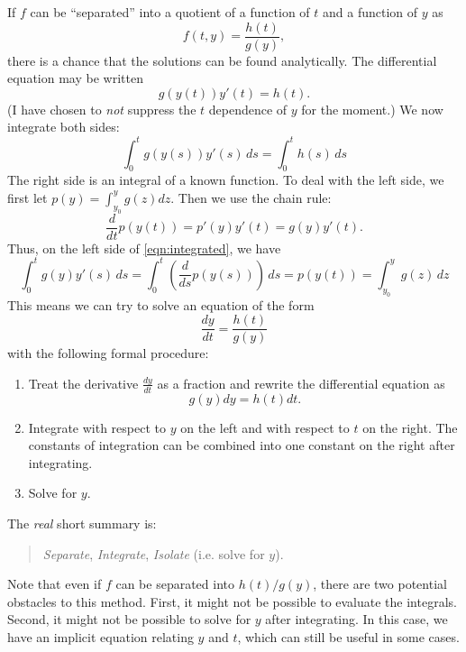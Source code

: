 \medskip
If $f$ can be ``separated'' into a quotient of a function of $t$ and a function
of $y$ as
\begin{equation}
   f(t,y) = \frac{h(t)}{g(y)},
\end{equation}
there is a chance that the solutions can
be found analytically.
The differential equation may be written
\begin{equation}
  g(y(t))y'(t) = h(t).
\label{eqn:separated}
\end{equation}
(I have chosen to \emph{not} suppress the $t$ dependence of
$y$ for the moment.)
We now integrate both sides:
\begin{equation}
    \int_0^t g(y(s))y'(s) \, ds = \int_0^t h(s) \, ds
\label{eqn:integrated}
\end{equation}
The right side is an integral of a known function.
To deal with the left side, we first let $p(y) = \int_{y_0}^y g(z) dz$.
Then  we use the chain rule:
\begin{equation}
   \frac{d}{dt} p(y(t)) = p'(y)y'(t) = g(y)y'(t).
\end{equation}
Thus, on the left side of \eqref{eqn:integrated}, we have
\begin{equation}
  \int_0^t g(y)y'(s)\,ds = \int_0^t \left(\frac{d}{ds} p(y(s))\right)\, ds = p(y(t)) = 
    \int_{y_0}^y g(z) \, dz
\end{equation}
This means we can try to solve an equation of the form
\begin{equation}
   \frac{dy}{dt} = \frac{h(t)}{g(y)}
\end{equation}
with the following formal procedure:
\begin{enumerate}
\item Treat the derivative $\frac{dy}{dt}$ as a fraction and rewrite the differential equation
as
\begin{equation}
   g(y)dy = h(t)dt.
\end{equation}
\item Integrate with respect to $y$ on the left and with respect to $t$ on the right.
The constants of integration can be combined into one constant on the right after
integrating.
\item Solve for $y$.
\end{enumerate}
The \emph{real} short summary is:
\begin{quote}
  \emph{Separate}, \emph{Integrate}, \emph{Isolate} (i.e. solve for $y$).
\end{quote}
Note that even if $f$ can be separated into $h(t)/g(y)$, there are two potential obstacles
to this method. First, it might not be possible to evaluate the integrals.
Second, it might not be possible to solve for $y$ after integrating.
In this case, we have an implicit equation relating $y$ and $t$, which can still
be useful in some cases.


